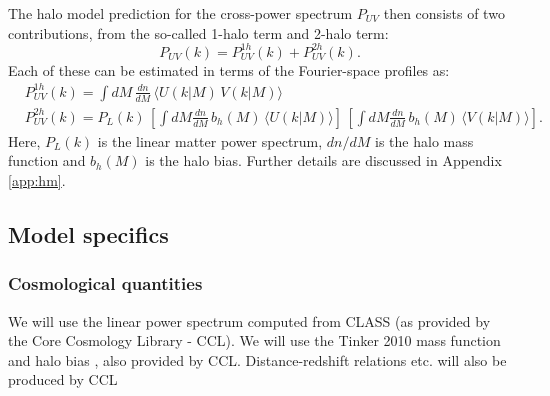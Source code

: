 \documentclass{article}
\begin{document}
    The halo model prediction for the cross-power spectrum $P_{UV}$ then consists of two contributions, from the so-called 1-halo term and 2-halo term:
    \begin{equation}
      P_{UV}(k)=P^{1h}_{UV}(k)+P^{2h}_{UV}(k).
    \end{equation}
    Each of these can be estimated in terms of the Fourier-space profiles as:
    \begin{align}
      &P^{1h}_{UV}(k)=\int dM\,\frac{dn}{dM}\,\langle U(k|M)\,V(k|M)\rangle\\
      &P^{2h}_{UV}(k)=P_L(k)\,\left[\int dM\frac{dn}{dM}\,b_h(M)\,\langle U(k|M)\rangle\right]\,\left[\int dM\frac{dn}{dM}\,b_h(M)\,\langle V(k|M)\rangle\right].
    \end{align}
    Here, $P_L(k)$ is the linear matter power spectrum, $dn/dM$ is the halo mass function and $b_h(M)$ is the halo bias. Further details are discussed in Appendix \ref{app:hm}.

  \subsection{Model specifics}
    \subsubsection{Cosmological quantities}
      We will use the linear power spectrum computed from CLASS (as provided by the Core Cosmology Library - CCL). We will use the Tinker 2010 mass function and halo bias \cite{2010ApJ...724..878T}, also provided by CCL. Distance-redshift relations etc. will also be produced by CCL
\end{document}
